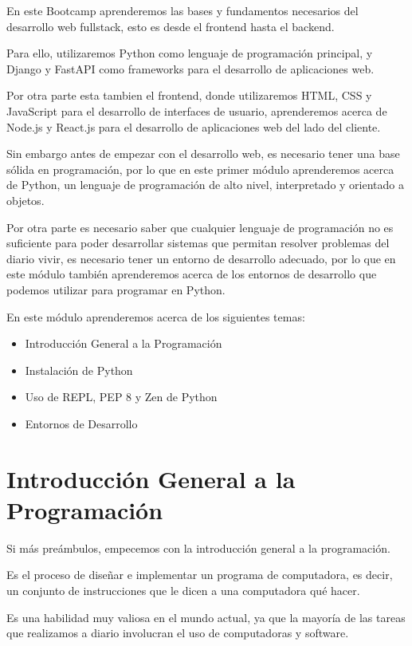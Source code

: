 \documentclass[
  a4paper,
  DIV=11,
  numbers=noendperiod,
  onepage,
  openany]{scrreprt}
\begin{document}
En este Bootcamp aprenderemos las bases y fundamentos necesarios del
desarrollo web fullstack, esto es desde el frontend hasta el backend.

Para ello, utilizaremos Python como lenguaje de programación principal,
y Django y FastAPI como frameworks para el desarrollo de aplicaciones
web.

Por otra parte esta tambien el frontend, donde utilizaremos HTML, CSS y
JavaScript para el desarrollo de interfaces de usuario, aprenderemos
acerca de Node.js y React.js para el desarrollo de aplicaciones web del
lado del cliente.

Sin embargo antes de empezar con el desarrollo web, es necesario tener
una base sólida en programación, por lo que en este primer módulo
aprenderemos acerca de Python, un lenguaje de programación de alto
nivel, interpretado y orientado a objetos.

Por otra parte es necesario saber que cualquier lenguaje de programación
no es suficiente para poder desarrollar sistemas que permitan resolver
problemas del diario vivir, es necesario tener un entorno de desarrollo
adecuado, por lo que en este módulo también aprenderemos acerca de los
entornos de desarrollo que podemos utilizar para programar en Python.

En este módulo aprenderemos acerca de los siguientes temas:

\begin{itemize}
\item
  Introducción General a la Programación
\item
  Instalación de Python
\item
  Uso de REPL, PEP 8 y Zen de Python
\item
  Entornos de Desarrollo
\end{itemize}

\section{Introducción General a la
Programación}\label{introducciuxf3n-general-a-la-programaciuxf3n}

Si más preámbulos, empecemos con la introducción general a la
programación.

Es el proceso de diseñar e implementar un programa de computadora, es
decir, un conjunto de instrucciones que le dicen a una computadora qué
hacer.

Es una habilidad muy valiosa en el mundo actual, ya que la mayoría de
las tareas que realizamos a diario involucran el uso de computadoras y
software.
\end{document}
